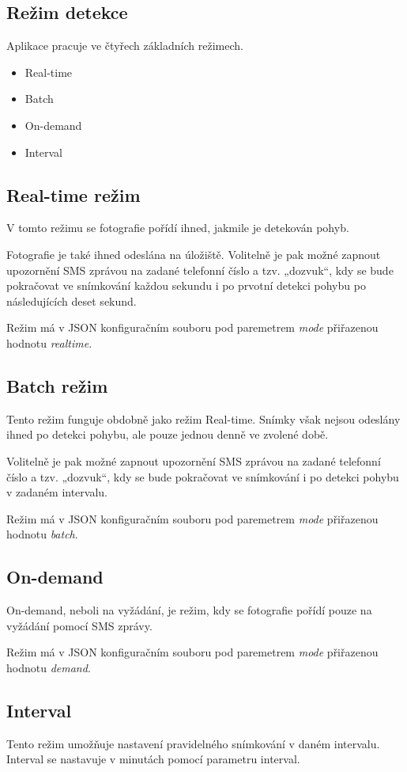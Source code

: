 \subsection*{Režim detekce}
Aplikace pracuje ve čtyřech základních režimech.
\begin{itemize}
    \item Real-time
    \item Batch
    \item On-demand
    \item Interval
\end{itemize}

\subsection*{Real-time režim}
V tomto režimu se fotografie pořídí ihned, jakmile je detekován pohyb.

Fotografie je také ihned odeslána na úložiště. Volitelně je pak možné zapnout upozornění SMS zprávou na zadané telefonní číslo a tzv. „dozvuk“, kdy se bude pokračovat ve snímkování každou sekundu i po prvotní detekci pohybu po následujících deset sekund.

Režim má v JSON konfiguračním souboru pod paremetrem \textit{mode} přiřazenou hodnotu \textit{realtime}.

\subsection*{Batch režim}
Tento režim funguje obdobně jako režim Real-time. Snímky však nejsou odeslány ihned po detekci pohybu, ale pouze jednou denně ve zvolené době.

Volitelně je pak možné zapnout upozornění SMS zprávou na zadané telefonní číslo a tzv.  „dozvuk“, kdy se bude pokračovat ve snímkování i po detekci pohybu v zadaném intervalu.

Režim má v JSON konfiguračním souboru pod paremetrem \textit{mode} přiřazenou hodnotu \textit{batch}.

\subsection*{On-demand}
On-demand, neboli na vyžádání, je režim, kdy se fotografie pořídí pouze na vyžádání pomocí SMS zprávy.

Režim má v JSON konfiguračním souboru pod paremetrem \textit{mode} přiřazenou hodnotu \textit{demand}.

\subsection*{Interval}
Tento režim umožňuje nastavení pravidelného snímkování v daném intervalu. Interval se nastavuje v minutách pomocí parametru interval.

